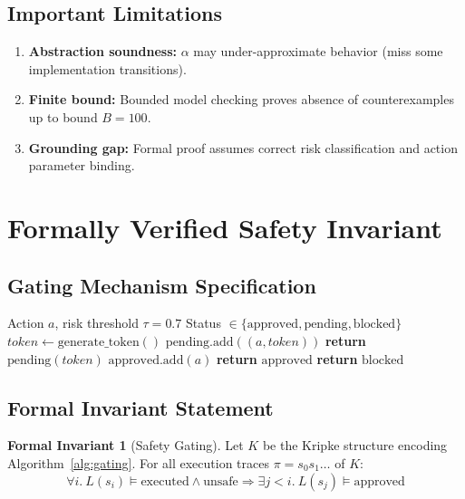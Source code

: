\documentclass[12pt]{article}
\theoremstyle{definition}
\newtheorem{invariant}{Formal Invariant}[section]
\begin{document}
\subsection{Important Limitations}
\begin{enumerate}
    \item \textbf{Abstraction soundness:} $\alpha$ may under-approximate behavior (miss some implementation transitions).
    \item \textbf{Finite bound:} Bounded model checking proves absence of counterexamples up to bound $B=100$.
    \item \textbf{Grounding gap:} Formal proof assumes correct risk classification and action parameter binding.
\end{enumerate}

\section{Formally Verified Safety Invariant}

\subsection{Gating Mechanism Specification}

\begin{algorithm}
\caption{Actuator Gating (Simplified for Verification)}
\begin{algorithmic}[1]
\REQUIRE Action $a$, risk threshold $\tau = 0.7$
\ENSURE Status $\in \{\text{approved}, \text{pending}, \text{blocked}\}$
    \STATE $token \gets \text{generate\_token}()$
    \STATE $\text{pending}.\text{add}((a, token))$
    \STATE \textbf{return} $\text{pending}(token)$
    \STATE $\text{approved}.\text{add}(a)$
    \STATE \textbf{return} $\text{approved}$
\ELSE
    \STATE \textbf{return} $\text{blocked}$
\ENDIF
\end{algorithmic}
\label{alg:gating}
\end{algorithm}

\subsection{Formal Invariant Statement}

\begin{invariant}[Safety Gating]
Let $K$ be the Kripke structure encoding Algorithm~\ref{alg:gating}. For all execution traces $\pi = s_0 s_1 \dots$ of $K$:
\[
\forall i.\ L(s_i) \models \text{executed} \land \text{unsafe} \Rightarrow \exists j < i.\ L(s_j) \models \text{approved}
\]
\end{invariant}
\end{document}
